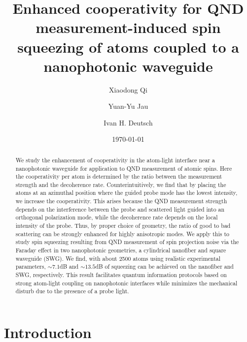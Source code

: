 \documentclass[preprint,aps,pra,onecolumn,superscriptaddress]{revtex4-1} %
\begin{document}
\title{Enhanced cooperativity for QND measurement-induced spin squeezing of atoms coupled to a nanophotonic waveguide}
\author{Xiaodong Qi}
\author{Yuan-Yu Jau}
\author{Ivan H. Deutsch}
\date{\today}

\begin{abstract}
We study the enhancement of cooperativity in the atom-light interface near a nanophotonic waveguide for application to QND measurement of atomic spins.  Here the cooperativity per atom is determined by the ratio between the  measurement strength and the decoherence rate.  Counterintuitively, we find that by placing the atoms at an azimuthal position where the guided probe mode has the lowest intensity, we increase the cooperativity.  This arises because the QND measurement strength depends on the interference between the probe and scattered light guided into an orthogonal polarization mode, while the decoherence rate depends on the local intensity of the probe.  Thus, by proper choice of geometry, the ratio of good to bad scattering can be strongly enhanced for highly anisotropic modes. We apply this to study spin squeezing resulting from QND measurement of spin projection noise via the Faraday effect in two nanophotonic geometries, a cylindrical nanofiber and square waveguide (SWG).  We find, with about 2500 atoms using realistic experimental parameters, $ \sim 7.1 $dB and $ \sim 13.5 $dB of squeezing can be achieved on the nanofiber and SWG, respectively. This result facilitates quantum information protocols based on strong atom-light coupling on nanophotonic interfaces while minimizes the mechanical disturb due to the presence of a probe light. 
\end{abstract}

\maketitle

\section{Introduction}
\end{document}
